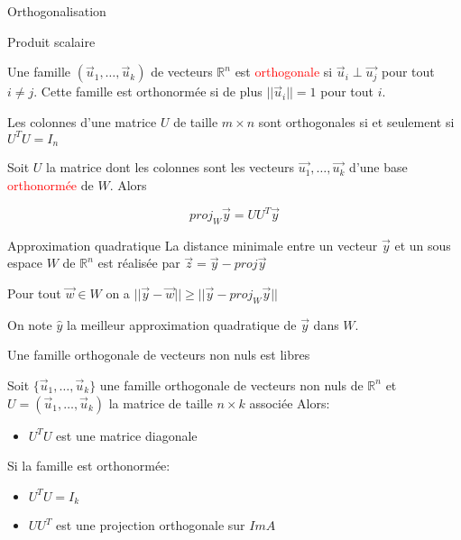 \begin{parag}{Orthogonalisation}
\begin{subparag}{Produit scalaire}
    \end{subparag}
    \begin{definition}
     Une famille $(\vec{u}_1, \dots, \vec{u}_k)$ de vecteurs $\mathbb{R}^n$ est \textcolor{red}{orthogonale} si $\vec{u}_i \perp \vec{u_j}$ pour tout $i \neq j$. Cette famille est orthonormée si de plus $||\vec{u}_i|| = 1$ pour tout $i$.
    \end{definition}
    \begin{theoreme}
        Les colonnes d'une matrice $U$ de taille $m \times n$ sont orthogonales si et seulement si $U^TU = I_n$
    \end{theoreme}
    \begin{theoreme}
        Soit $U$ la matrice dont les colonnes sont les vecteurs $\vec{u_1}, \dots, \vec{u_k}$ d'une base \textcolor{red}{orthonormée} de $W$. Alors
        \begin{formule}
            \[proj_W\vec{y} = UU^T\vec{y}\]
        \end{formule}
    \end{theoreme}
    \begin{subparag}{Approximation quadratique}
        La distance minimale entre un vecteur $\vec{y}$ et un sous espace $W$ de $\mathbb{R}^n$ est réalisée par $\vec{z} = \vec{y} - proj\vec{y}$
        \begin{theoreme}
            Pour tout $\vec{w}\in W$ on a $||\vec{y} - \vec{w}|| \geq || \vec{y} - proj_W\vec{y}||$
        \end{theoreme}
        On note $\hat{y}$ la meilleur approximation quadratique de $\vec{y}$ dans $W$.
    \end{subparag}
    \begin{truc}
        Une famille orthogonale de vecteurs non nuls est libres
    \end{truc}
    \begin{truc}
        Soit $\{\vec{u}_1, \dots, \vec{u}_k\}$ une famille orthogonale de vecteurs non nuls de $\mathbb{R}^n$ et $U = (\vec{u}_1, \dots,\vec{u}_k)$ la matrice de taille $n\times k$ associée Alors:
        \begin{itemize}
            \item $U^TU$ est une matrice diagonale
        \end{itemize}
        Si la famille est orthonormée:
        \begin{itemize}
            \item $U^TU= I_k$
            \item $UU^T$ est une projection orthogonale sur $ImA$

\end{itemize}
\end{truc}
\end{parag}
